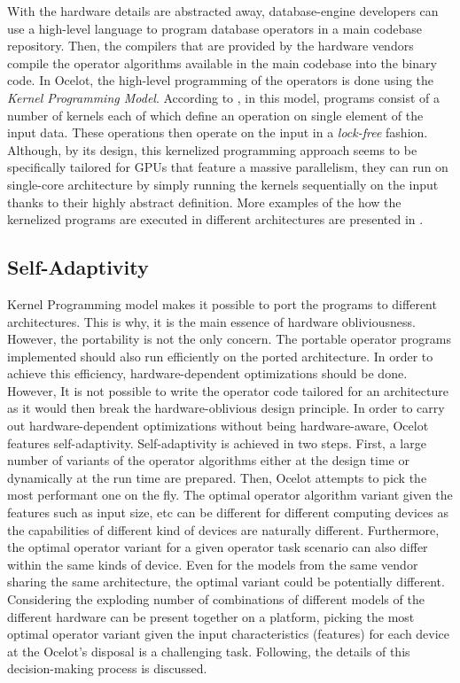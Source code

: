 With the hardware details are abstracted away, database-engine developers can use a high-level language to program database operators in a main codebase repository. Then, the compilers that are provided by the hardware vendors compile the operator algorithms available in the main codebase into the binary code. In Ocelot, the high-level programming of the operators is done using the \textit{Kernel Programming Model}. According to \citep[pp. 710-711]{heimel_hardware-oblivious_2013}, in this model, programs consist of a number of kernels each of which define an operation on single element of the input data. These operations then operate on the input in a \textit{lock-free} fashion. Although, by its design, this kernelized programming approach seems to be specifically tailored for GPUs that feature a massive parallelism, they can run on single-core architecture by simply running the kernels sequentially on the input thanks to their highly abstract definition. More examples of the how the kernelized programs are executed in different architectures are presented in \citep[p. 711]{heimel_hardware-oblivious_2013}.

\subsection{Self-Adaptivity}

Kernel Programming model makes it possible to port the programs to different architectures. This is why, it is the main essence of hardware obliviousness. However, the portability is not the only concern. The portable operator programs implemented should also run efficiently on the ported architecture. In order to achieve this efficiency, hardware-dependent optimizations should be done. However, It is not possible to write the operator code tailored for an architecture as it would then break the hardware-oblivious design principle. In order to carry out hardware-dependent optimizations without being hardware-aware, Ocelot features self-adaptivity. Self-adaptivity is achieved in two steps. First, a large number of variants of the operator algorithms either at the design time or dynamically at the run time are prepared. Then, Ocelot attempts to pick the most performant one on the fly. The optimal operator algorithm variant given the features such as input size, etc can be different for different computing devices as the capabilities of different kind of devices are naturally different. Furthermore, the optimal operator variant for a given operator task scenario can also differ within the same kinds of device. Even for the models from the same vendor sharing the same architecture, the optimal variant could be potentially different. Considering the exploding number of combinations of different models of the different hardware can be present together on a platform, picking the most optimal operator variant given the input characteristics (features) for each device at the Ocelot's disposal is a challenging task. Following, the details of this decision-making process is discussed.

